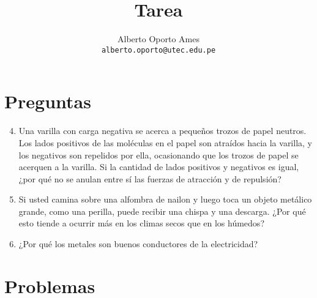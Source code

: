 \documentclass[12pt, twoside]{article}
\title{\textbf{Tarea}}
\author{
		Alberto Oporto Ames\\
		\texttt{alberto.oporto@utec.edu.pe}\\
		}
\begin{document}
\maketitle
\thispagestyle{fancy}

\section{Preguntas}%
\label{sec:Preguntas}

\begin{enumerate}
	\setcounter{enumi}{3}
	\item Una varilla con carga negativa se acerca a pequeños trozos de papel neutros.
		Los lados positivos de las moléculas en el papel son atraídos hacia la varilla,
		y los negativos son repelidos por ella,
		ocasionando que los trozos de papel se acerquen a la varilla.
		Si la cantidad de lados positivos y negativos es igual,
		¿por qué no se anulan entre sí las fuerzas de atracción y de repulsión?

	\item Si usted camina sobre una alfombra de nailon y luego toca un objeto metálico grande,
		como una perilla, puede recibir una chispa y una descarga.
		¿Por qué esto tiende a ocurrir más en los climas secos que en los húmedos?

	\item ¿Por qué los metales son buenos conductores de la electricidad?
\end{enumerate}
\section{Problemas}%
\label{sec:Problemas}
\end{document}
